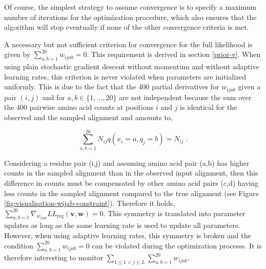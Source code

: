 \documentclass[11pt,a4paper,twoside]{book}
\newcommand{\eq}{\!=\!}
\newcommand{\LLreg}{L\!L_\mathrm{reg}}
\renewcommand{\v}{\mathbf{v}}
\newcommand{\w}{\mathbf{w}}
\newcommand{\wijab}{w_{ijab}}
\theoremstyle{definition}
\theoremstyle{definition}
\theoremstyle{remark}
\begin{document}
Of course, the simplest strategy to assume convergence is to specify a
maximum number of iterations for the optimization procedure, which also
ensures that the algorithm will stop eventually if none of the other
convergence criteria is met.

A necessary but not sufficient criterion for convergence for the full
likelihood is given by \(\sum_{a,b=1}^{20} \wijab = 0\). This
requirement is derived in section \ref{prior-v}. When using plain
stochastic gradient descent without momentum and without adaptive
learning rates, this criterion is never violated when parameters are
initialized uniformly. This is due to the fact that the 400 partial
derivatives for \(\wijab\) given a pair \((i,j)\) and for
\(a,b \in \{1, \ldots, 20\}\) are not independent because the sum over
the 400 pairwise amino acid counts at positions \(i\) and \(j\) is
identical for the observed and the sampled alignment and amounts to,

\begin{equation}
  \sum_{a,b=1}^{20} N_{ij} q(x_i \eq a, q_j \eq b) = N_{ij} \; .
\end{equation}

Considering a residue pair (i,j) and assuming amino acid pair (a,b) has
higher counts in the sampled alignment than in the observed input
alignment, then this difference in counts must be compensated by other
amino acid pairs (c,d) having less counts in the sampled alignment
compared to the true alignment (see Figure
\ref{fig:visualisation-wijab-constraint}). Therefore it holds,
\(\sum_{a,b=1}^{20} \nabla_{\wijab}\LLreg(\v,\w) = 0\). This symmetry is
translated into parameter updates as long as the same learning rate is
used to update all parameters. However, when using adaptive learning
rates, this symmetry is broken and the condition
\(\sum_{a,b=1}^{20} \wijab = 0\) can be violated during the optimization
processs. It is therefore interesting to monitor
\(\sum_{1 \le 1 < j \le L} \sum_{a,b=1}^{20} \wijab\).
\end{document}
